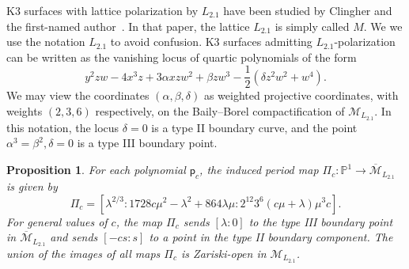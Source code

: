 \documentclass[10pt]{amsart}
\numberwithin{equation}{section}
\theoremstyle{plain}
\newtheorem{proposition}[theorem]{Proposition}
\theoremstyle{definition}
\theoremstyle{remark}
\begin{document}
K3 surfaces with lattice polarization by \(L_{2.1}\) have been studied by Clingher and the first-named author~\cite{clingher2007modular}. In that paper, the lattice \(L_{2.1}\) is simply called \(M\). We we use the notation \(L_{2.1}\) to avoid confusion. K3 surfaces admitting \(L_{2.1}\)-polarization can be written as the vanishing locus of quartic polynomials of the form
\begin{equation}\label{equation:cd}
  y^2zw - 4x^3z + 3\alpha xzw^2 + \beta zw^3 - \dfrac{1}{2}(\delta z^2w^2 + w^4).
\end{equation}
We may view the coordinates \((\alpha, \beta, \delta)\) as weighted projective coordinates, with weights \((2,3,6)\) respectively, on the Baily--Borel compactification of \(\mathcal{M}_{L_{2.1}}\). In this notation, the locus \(\delta =0\) is a type II boundary curve, and the point \(\alpha^3= \beta^2, \delta =0\) is a type III boundary point.

\begin{proposition}\label{proposition:2.1}
  For each polynomial \(\mathsf{p}_c\), the induced period map \(\Pi_c \colon \mathbb{P}^1 \rightarrow \overline{\mathcal{M}}_{L_{2.1}}\) is given by
  \[
    \Pi_c = \left[\lambda^{2/3} : 1728c\mu^2 - \lambda^2 + 864\lambda \mu  : 2^{12}3^6{(c\mu + \lambda)\mu^3c}\right].
  \]
For general values of \(c\), the map \(\Pi_c\) sends \([\lambda:0]\) to the type III boundary point in \(\overline{\mathcal{M}}_{L_{2.1}}\) and sends \([-cs:s]\) to a point in the type II boundary component. The union of the images of all maps \(\Pi_c\) is Zariski-open in \(\mathfrak{\mathcal{M}}_{L_{2.1}}\).
\end{proposition}
\end{document}
